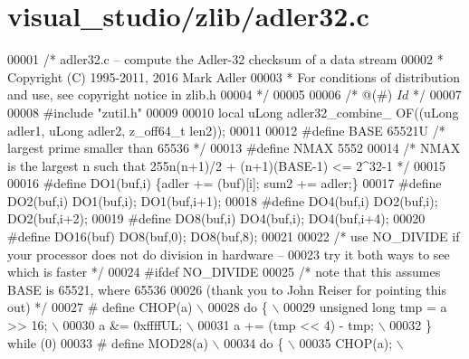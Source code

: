 \hypertarget{visual__studio_2zlib_2adler32_8c_source}{}\section{visual\+\_\+studio/zlib/adler32.c}
\label{visual__studio_2zlib_2adler32_8c_source}

\begin{DoxyCode}
00001 \textcolor{comment}{/* adler32.c -- compute the Adler-32 checksum of a data stream}
00002 \textcolor{comment}{ * Copyright (C) 1995-2011, 2016 Mark Adler}
00003 \textcolor{comment}{ * For conditions of distribution and use, see copyright notice in zlib.h}
00004 \textcolor{comment}{ */}
00005 
00006 \textcolor{comment}{/* @(#) $Id$ */}
00007 
00008 \textcolor{preprocessor}{#include "zutil.h"}
00009 
00010 local uLong adler32\_combine\_ OF((uLong adler1, uLong adler2, z\_off64\_t len2));
00011 
00012 \textcolor{preprocessor}{#define BASE 65521U     }\textcolor{comment}{/* largest prime smaller than 65536 */}\textcolor{preprocessor}{}
00013 \textcolor{preprocessor}{#define NMAX 5552}
00014 \textcolor{comment}{/* NMAX is the largest n such that 255n(n+1)/2 + (n+1)(BASE-1) <= 2^32-1 */}
00015 
00016 \textcolor{preprocessor}{#define DO1(buf,i)  \{adler += (buf)[i]; sum2 += adler;\}}
00017 \textcolor{preprocessor}{#define DO2(buf,i)  DO1(buf,i); DO1(buf,i+1);}
00018 \textcolor{preprocessor}{#define DO4(buf,i)  DO2(buf,i); DO2(buf,i+2);}
00019 \textcolor{preprocessor}{#define DO8(buf,i)  DO4(buf,i); DO4(buf,i+4);}
00020 \textcolor{preprocessor}{#define DO16(buf)   DO8(buf,0); DO8(buf,8);}
00021 
00022 \textcolor{comment}{/* use NO\_DIVIDE if your processor does not do division in hardware --}
00023 \textcolor{comment}{   try it both ways to see which is faster */}
00024 \textcolor{preprocessor}{#ifdef NO\_DIVIDE}
00025 \textcolor{comment}{/* note that this assumes BASE is 65521, where 65536 %
00026 \textcolor{comment}{   (thank you to John Reiser for pointing this out) */}
00027 \textcolor{preprocessor}{#  define CHOP(a) \(\backslash\)}
00028 \textcolor{preprocessor}{    do \{ \(\backslash\)}
00029 \textcolor{preprocessor}{        unsigned long tmp = a >> 16; \(\backslash\)}
00030 \textcolor{preprocessor}{        a &= 0xffffUL; \(\backslash\)}
00031 \textcolor{preprocessor}{        a += (tmp << 4) - tmp; \(\backslash\)}
00032 \textcolor{preprocessor}{    \} while (0)}
00033 \textcolor{preprocessor}{#  define MOD28(a) \(\backslash\)}
00034 \textcolor{preprocessor}{    do \{ \(\backslash\)}
00035 \textcolor{preprocessor}{        CHOP(a); \(\backslash\)}
}
\end{DoxyCode}
